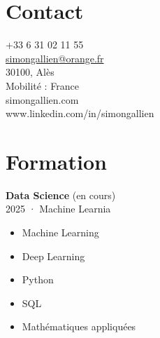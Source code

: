\documentclass[a4paper,12pt]{article}
\begin{document}
\noindent
{}

\vspace{-1em}


\begin{paracol}{2}

\begin{leftcolumn}
  \begin{minipage}[t][\dimexpr\textheight - 9em\relax][t]{\dimexpr\linewidth}
    \hspace*{1.5em}
    \parbox{\dimexpr\linewidth-1.5em\relax}{

    \section*{Contact}
    \small
    +33 6 31 02 11 55\\
    \href{mailto:simongallien@orange.fr}{simongallien@orange.fr}\\
    30100, Alès\\
    Mobilité : France\\
    simongallien.com\\
    www.linkedin.com/in/simongallien


    \vspace{1em}
    \section*{Formation}
    \textbf{Data Science} (en cours)\\
    \footnotesize 2025 · Machine Learnia 
    \begin{itemize}[leftmargin=1em, nosep]
      \item Machine Learning
      \item Deep Learning
      \item Python
      \item SQL
      \item Mathématiques appliquées\\
    \end{itemize}

}
\end{minipage}
\end{leftcolumn}
\end{paracol}
\end{document}
